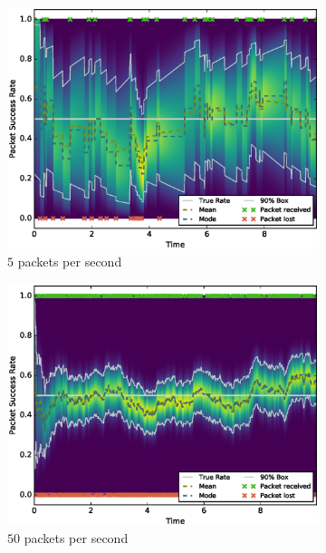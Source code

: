 \documentclass[10pt,a4paper]{article}
\begin{document}
\begin{figure}[h!]
  \centering
  \begin{subfigure}[b]{0.45\textwidth}
		\includegraphics[width=\textwidth]{trust/const-0-5-rate-5}
		\caption{$5$ packets per second}
	\end{subfigure}
  \begin{subfigure}[b]{0.45\textwidth}
		\includegraphics[width=\textwidth]{trust/const-0-5-rate-50}
		\caption{$50$ packets per second}
	\end{subfigure}
  \begin{subfigure}[b]{\textwidth}

\end{subfigure}
\end{figure}
\end{document}
